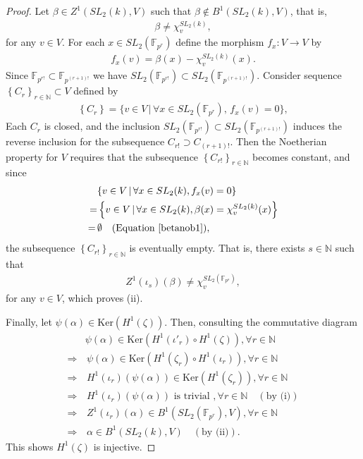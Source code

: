 \begin{proof}
Let $\beta\in Z^1(SL_2(k), V)$ such that $\beta \notin B^1(SL_2(k), V)$, that is,
\begin{align}\label{betanob1}
	\beta \neq \chi^{SL_2(k)}_v,
\end{align}
for any $v \in V$. For each $x\in SL_2(\mathbb{F}_{p^r})$ define the morphism $f_x:V\rightarrow V$ by
	\begin{align*}
		f_x(v) = \beta(x) - \chi^{SL_2(k)}_v(x).
	\end{align*}
Since $\mathbb{F}_{p^{r!}} \subset \mathbb{F}_{p^{(r+1)!}}$ we have $SL_2(\mathbb{F}_{p^{r!}}) \subset SL_2(\mathbb{F}_{p^{(r+1)!}})$.
Consider sequence $\left\{C_{r}\right\}_{r \in \mathbb{N}} \subset V$ defined by
	\begin{align*}
		\left\{C_{r}\right\} = \{v \in V \,|\,\forall x\in SL_2(\mathbb{F}_{p^{r}}),\, f_x(v) = 0\},
	\end{align*}
	Each $C_{r}$ is closed, and the inclusion $SL_2(\mathbb{F}_{p^{r!}}) \subset SL_2(\mathbb{F}_{p^{(r+1)!}})$ induces the reverse inclusion for the subsequence $C_{r!} \supset C_{(r+1)!}$.
Then the Noetherian property for $V$ requires that the subsequence $\left\{C_{r!}\right\}_{r \in \mathbb{N}}$ becomes constant, and since
\begin{align*}
	&\{v \in V \,|\, \forall x \in SL_2(k), f_x(v) = 0\} \\
	= &\left\{v \in V \,|\, \forall x \in SL_2(k), \beta(x) = \chi^{SL_2(k)}_v(x)\right\} \\
	= \,&\emptyset \quad(\textrm{Equation }\ref{betanob1}), 
\end{align*}
the subsequence $\left\{C_{r!}\right\}_{r \in \mathbb{N}}$ is eventually empty.
That is, there exists $s\in\mathbb{N}$ such that
	\begin{align*}
		Z^1(\iota_s)(\beta) \neq \chi_v^{SL_2(\mathbb{F}_{p^{s}})},
	\end{align*}
	for any $v \in V$, which proves (ii).

Finally, let $\psi(\alpha) \in \mathrm{Ker}\left(H^1(\zeta)\right)$.
Then, consulting the commutative diagram
\begin{align*}
	&\psi(\alpha) \in \mathrm{Ker}\left(H^1(\iota'_r) \circ H^1(\zeta)\right), \forall r \in \mathbb{N} \\
	\Rightarrow &\,\psi(\alpha) \in \mathrm{Ker}\left(H^1(\zeta_r) \circ H^1(\iota_r)\right), \forall r \in \mathbb{N}  \\
	\Rightarrow &\,H^1(\iota_r)(\psi(\alpha)) \in \mathrm{Ker}\left(H^1(\zeta_r)\right), \forall r \in \mathbb{N}  \\
	\Rightarrow &\,H^1(\iota_r)(\psi(\alpha))\textrm{ is trivial }, \forall r \in \mathbb{N} \quad(\textrm{by (i)}) \\
	\Rightarrow &\,Z^1(\iota_r)(\alpha) \in B^1(SL_2(\mathbb{F}_{p^r}), V), \forall r \in \mathbb{N}  \\
	\Rightarrow &\,\alpha \in B^1(SL_2(k), V)\quad(\textrm{by (ii)}).
\end{align*}
This shows $H^1(\zeta)$ is injective.
\end{proof}

